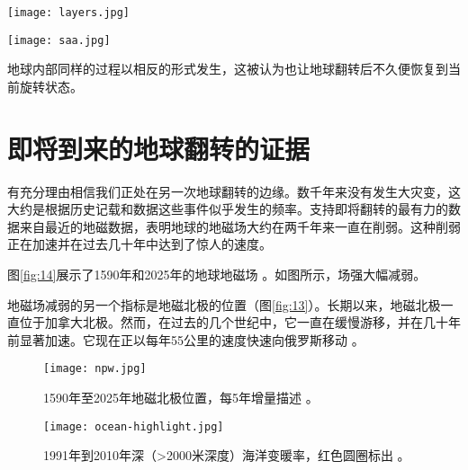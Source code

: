 \documentclass[10pt,twocolumn,letterpaper]{article}
\begin{document}
\begin{figure*}[t]
\begin{center}
\texttt{[image: layers.jpg]}
\end{center}
   \caption{地球内部变化导致 ECDO 翻转的解释 \cite{129}}
\label{fig:11}
\end{figure*}

\begin{figure*}[b]
\begin{center}
\texttt{[image: saa.jpg]}
\end{center}
   \caption{从 1590 年到 2025 年的地磁场削弱的描述。使用 gufm1 和 IGRF-14 模型计算 \cite{125,126}。}
\label{fig:14}
\end{figure*}

地球内部同样的过程以相反的形式发生，这被认为也让地球翻转后不久便恢复到当前旋转状态。

\section{即将到来的地球翻转的证据}

有充分理由相信我们正处在另一次地球翻转的边缘。数千年来没有发生大灾变，这大约是根据历史记载和数据这些事件似乎发生的频率。支持即将翻转的最有力的数据来自最近的地磁数据，表明地球的地磁场大约在两千年来一直在削弱。这种削弱正在加速并在过去几十年中达到了惊人的速度。

图\ref{fig:14}展示了1590年和2025年的地球地磁场 \cite{125,126}。如图所示，场强大幅减弱。

地磁场减弱的另一个指标是地磁北极的位置（图\ref{fig:13}）。长期以来，地磁北极一直位于加拿大北极。然而，在过去的几个世纪中，它一直在缓慢游移，并在几十年前显著加速。它现在正以每年55公里的速度快速向俄罗斯移动 \cite{124}。

\begin{figure}[t]
\begin{center}
   \texttt{[image: npw.jpg]}
\end{center}
   \caption{1590年至2025年地磁北极位置，每5年增量描述 \cite{142}。}
\label{fig:13}
\label{fig:onecol}
\end{figure}

\begin{figure}[t]
\begin{center}
   \texttt{[image: ocean-highlight.jpg]}
\end{center}
   \caption{1991年到2010年深（>2000米深度）海洋变暖率，红色圆圈标出 \cite{132}。}
\label{fig:15}
\label{fig:onecol}
\end{figure}
\end{document}
